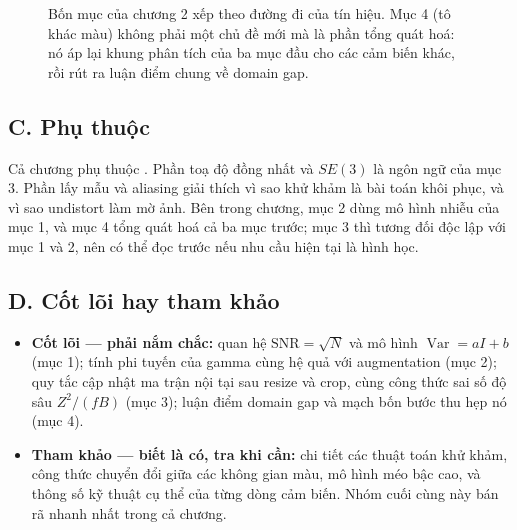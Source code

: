 \documentclass[../../deep_learning.tex]{subfiles}
\begin{document}
\begin{figure}[H]\centering
{}
\caption{Bốn mục của chương 2 xếp theo đường đi của tín hiệu. Mục 4 (tô khác màu) không phải một chủ đề mới mà là phần tổng quát hoá: nó áp lại khung phân tích của ba mục đầu cho các cảm biến khác, rồi rút ra luận điểm chung về domain gap.}
\label{fig:map-ch2}
\end{figure}

\subsection*{C. Phụ thuộc}
Cả chương phụ thuộc . Phần toạ độ đồng nhất và \(SE(3)\) là ngôn ngữ của mục 3. Phần lấy mẫu và aliasing giải thích vì sao khử khảm là bài toán khôi phục, và vì sao undistort làm mờ ảnh. Bên trong chương, mục 2 dùng mô hình nhiễu của mục 1, và mục 4 tổng quát hoá cả ba mục trước; mục 3 thì tương đối độc lập với mục 1 và 2, nên có thể đọc trước nếu nhu cầu hiện tại là hình học.

\subsection*{D. Cốt lõi hay tham khảo}
\begin{itemize}
\item \textbf{Cốt lõi --- phải nắm chắc:} quan hệ \(\mathrm{SNR}=\sqrt{N}\) và mô hình \(\operatorname{Var}=aI+b\) (mục 1); tính phi tuyến của gamma cùng hệ quả với augmentation (mục 2); quy tắc cập nhật ma trận nội tại sau resize và crop, cùng công thức sai số độ sâu \(Z^2/(fB)\) (mục 3); luận điểm domain gap và mạch bốn bước thu hẹp nó (mục 4).
\item \textbf{Tham khảo --- biết là có, tra khi cần:} chi tiết các thuật toán khử khảm, công thức chuyển đổi giữa các không gian màu, mô hình méo bậc cao, và thông số kỹ thuật cụ thể của từng dòng cảm biến. Nhóm cuối cùng này bán rã nhanh nhất trong cả chương.
\end{itemize}
\end{document}
